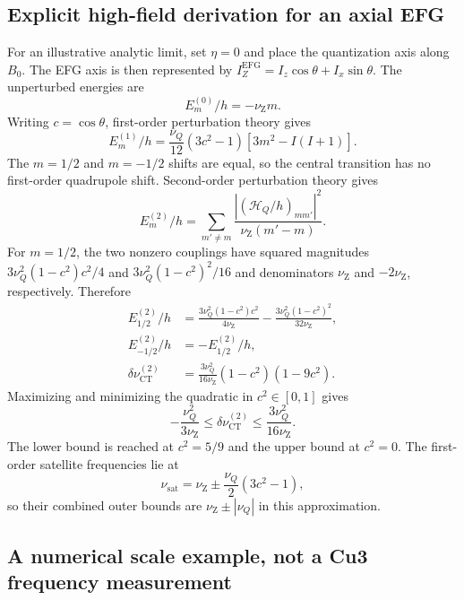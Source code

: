 \documentclass[11pt,a4paper]{article}
\newcommand{\nuq}{\nu_Q}
\newcommand{\nuz}{\nu_{\mathrm Z}}
\begin{document}
\subsection{Explicit high-field derivation for an axial EFG}

For an illustrative analytic limit, set $\eta=0$ and place the quantization
axis along $B_0$. The EFG axis is then represented by
$I_Z^{\mathrm{EFG}}=I_z\cos\theta+I_x\sin\theta$. The unperturbed energies are
\begin{equation}
 E_m^{(0)}/h=-\nuz m.
\end{equation}
Writing $c=\cos\theta$, first-order perturbation theory gives
\begin{equation}
 E_m^{(1)}/h=\frac{\nuq}{12}(3c^2-1)
 [3m^2-I(I+1)].
\end{equation}
The $m=1/2$ and $m=-1/2$ shifts are equal, so the central transition has no
first-order quadrupole shift. Second-order perturbation theory gives
\begin{equation}
 E_m^{(2)}/h=\sum_{m'\ne m}
 \frac{|(\mathcal H_Q/h)_{mm'}|^2}{\nuz(m'-m)}.
\end{equation}
For $m=1/2$, the two nonzero couplings have squared magnitudes
$3\nuq^2(1-c^2)c^2/4$ and $3\nuq^2(1-c^2)^2/16$ and denominators
$\nuz$ and $-2\nuz$, respectively. Therefore
\begin{align}
 E_{1/2}^{(2)}/h
 &=\frac{3\nuq^2(1-c^2)c^2}{4\nuz}
 -\frac{3\nuq^2(1-c^2)^2}{32\nuz},\\
 E_{-1/2}^{(2)}/h&=-E_{1/2}^{(2)}/h,\\
 \delta\nu_{\mathrm{CT}}^{(2)}
 &=\frac{3\nuq^2}{16\nuz}(1-c^2)(1-9c^2).
\label{eq:ct}
\end{align}
Maximizing and minimizing the quadratic in $c^2\in[0,1]$ gives
\begin{equation}
 -\frac{\nuq^2}{3\nuz}\leq\delta\nu_{\mathrm{CT}}^{(2)}
 \leq\frac{3\nuq^2}{16\nuz}.
\end{equation}
The lower bound is reached at $c^2=5/9$ and the upper bound at $c^2=0$.
The first-order satellite frequencies lie at
\begin{equation}
 \nu_{\mathrm{sat}}=\nuz\pm\frac{\nuq}{2}(3c^2-1),
\end{equation}
so their combined outer bounds are $\nuz\pm|\nuq|$ in this approximation.

\subsection{A numerical scale example, not a Cu3 frequency measurement}
\end{document}
